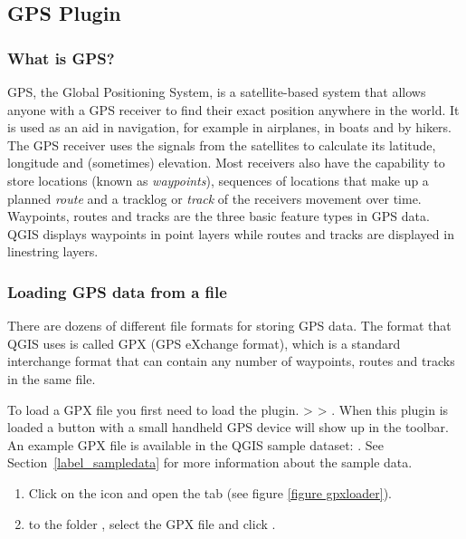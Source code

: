 
\subsection{GPS Plugin}\label{label_plugingps}


\subsubsection{What is GPS?}\label{whatsgps}

GPS, the Global Positioning System, is a satellite-based system that allows anyone with a GPS receiver to find their exact position anywhere in the world.
It is used as an aid in navigation, for example in airplanes, in boats and by hikers.
The GPS receiver uses the signals from the satellites to calculate its latitude, longitude and (sometimes) elevation.
Most receivers also have the capability to store locations (known as \emph{waypoints}), sequences of locations that make up a planned \emph{route} and a tracklog or \emph{track} of the receivers movement over time.
Waypoints, routes and tracks are the three basic feature types in GPS data.
QGIS displays waypoints in point layers while routes and tracks are displayed in linestring layers.

\subsubsection{Loading GPS data from a file}\label{label_loadgps}

There are dozens of different file formats for storing GPS data.
The format that QGIS uses is called GPX (GPS eXchange format), which is a standard interchange format that can contain any number of waypoints, routes and tracks in the same file.

To load a GPX file you first need to load the plugin.
 >  > . When this plugin is loaded a button with a 
small handheld GPS device will show up in the toolbar. An example GPX file is 
available in the QGIS sample dataset:
. See
Section~\ref{label_sampledata} for more information about the sample data.

\begin{enumerate}
\item Click on the  icon and open the
 tab (see figure \ref{figure gpxloader}).
\item {} to the folder ,
select the GPX file  and click .
\end{enumerate}

